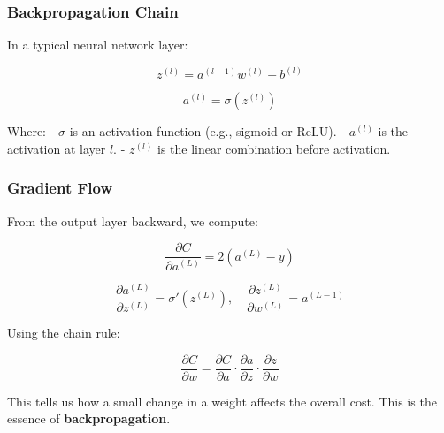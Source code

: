 \subsubsection*{Backpropagation Chain}

In a typical neural network layer:

\[
z^{(l)} = a^{(l-1)} w^{(l)} + b^{(l)}
\]

\[
a^{(l)} = \sigma(z^{(l)})
\]

Where:
- $\sigma$ is an activation function (e.g., sigmoid or ReLU).
- $a^{(l)}$ is the activation at layer $l$.
- $z^{(l)}$ is the linear combination before activation.

\subsubsection*{Gradient Flow}

From the output layer backward, we compute:

\[
\frac{\partial C}{\partial a^{(L)}} = 2(a^{(L)} - y)
\]

\[
\frac{\partial a^{(L)}}{\partial z^{(L)}} = \sigma'(z^{(L)}), \quad \frac{\partial z^{(L)}}{\partial w^{(L)}} = a^{(L-1)}
\]

Using the chain rule:

\[
\frac{\partial C}{\partial w} = \frac{\partial C}{\partial a} \cdot \frac{\partial a}{\partial z} \cdot \frac{\partial z}{\partial w}
\]

This tells us how a small change in a weight affects the overall cost. This is the essence of \textbf{backpropagation}.
